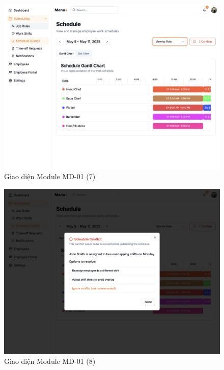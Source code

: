 \begin{figure}[H]
    \centering
    \includegraphics[width=\linewidth]{Sections/hien_thuc/img/1.7.png}
    \vspace{0.5cm}
    \caption{Giao diện Module MD-01 (7)}
    \label{fig:gantt_module_md01_7}
\end{figure}

\begin{figure}[H]
    \centering
    \includegraphics[width=\linewidth]{Sections/hien_thuc/img/1.8.png}
    \vspace{0.5cm}
    \caption{Giao diện Module MD-01 (8)}
    \label{fig:gantt_module_md01_8}
\end{figure}

